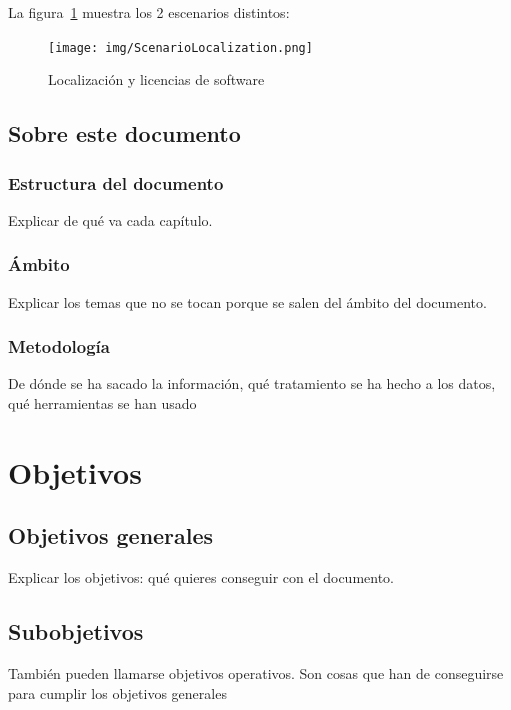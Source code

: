 \documentclass[a4paper, 12pt]{book}
\begin{document}
La figura~\ref{fig:ScenarioLocalization} muestra los 2 escenarios distintos:

  \begin{center}
   \begin{figure}[htbp]
   \begin{center}
     \texttt{[image: img/ScenarioLocalization.png]}
     \caption{Localización y licencias de software}
\label{fig:ScenarioLocalization}
   \end{center}
    \end{figure}
   \end{center}


\section{Sobre este documento}
\label{sec:about}

\subsection{Estructura del documento}

Explicar de qué va cada capítulo.

\subsection{Ámbito}
\label{subsec:scope}
Explicar los temas que no se tocan porque se salen del ámbito del documento.

\subsection{Metodología}
\label{subsec:methodology}
De dónde se ha sacado la información, qué tratamiento se ha hecho a los datos,
qué herramientas se han usado

\chapter{Objetivos}
\label{chap:Goals} 
\section{Objetivos generales}

Explicar los objetivos: qué quieres conseguir con el documento.

\section{Subobjetivos}
También pueden llamarse objetivos operativos. Son cosas que han de conseguirse
para cumplir los objetivos generales
\end{document}
